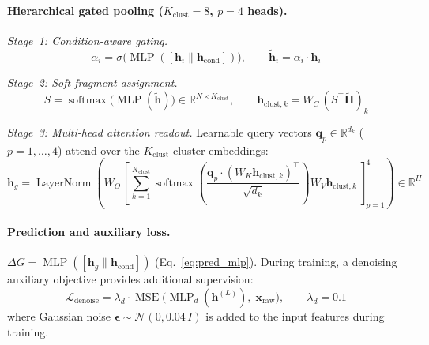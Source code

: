 \documentclass[11pt]{article}
\begin{document}
\paragraph{Hierarchical gated pooling ($K_{\mathrm{clust}} = 8$, $p = 4$ heads).}

\textit{Stage~1: Condition-aware gating.}
\begin{equation}
  \alpha_i = \sigma\!\bigl(
    \operatorname{MLP}([\mathbf{h}_i \| \mathbf{h}_{\mathrm{cond}}])
  \bigr), \qquad
  \tilde{\mathbf{h}}_i = \alpha_i \cdot \mathbf{h}_i
\end{equation}

\textit{Stage~2: Soft fragment assignment.}
\begin{equation}
  S = \operatorname{softmax}\!\bigl(
    \operatorname{MLP}(\tilde{\mathbf{h}})
  \bigr) \in \mathbb{R}^{N \times K_{\mathrm{clust}}}, \qquad
  \mathbf{h}_{\mathrm{clust},k} = W_C\,
  (S^\top \tilde{\mathbf{H}})_k
  \label{eq:soft_assign}
\end{equation}

\textit{Stage~3: Multi-head attention readout.}
Learnable query vectors $\mathbf{q}_p \in \mathbb{R}^{d_k}$ ($p = 1, \ldots, 4$)
attend over the $K_{\mathrm{clust}}$ cluster embeddings:
\begin{equation}
  \mathbf{h}_g = \operatorname{LayerNorm}\!\left(
    W_O \left[\,
    \sum_{k=1}^{K_{\mathrm{clust}}}
    \operatorname{softmax}\!\left(
      \frac{\mathbf{q}_p \cdot (W_K \mathbf{h}_{\mathrm{clust},k})^\top}
      {\sqrt{d_k}}
    \right)
    W_V \mathbf{h}_{\mathrm{clust},k}
    \,\right]_{p=1}^{4}
  \right) \in \mathbb{R}^{H}
\end{equation}

\paragraph{Prediction and auxiliary loss.}
$\Delta G = \operatorname{MLP}([\mathbf{h}_g \| \mathbf{h}_{\mathrm{cond}}])$
(Eq.~\ref{eq:pred_mlp}).
During training, a denoising auxiliary objective provides additional
supervision:
\begin{equation}
  \mathcal{L}_{\mathrm{denoise}} = \lambda_d \cdot
  \operatorname{MSE}\!\bigl(
    \operatorname{MLP}_d(\mathbf{h}^{(L)}),\;
    \mathbf{x}_{\mathrm{raw}}
  \bigr), \qquad
  \lambda_d = 0.1
  \label{eq:denoise}
\end{equation}
where Gaussian noise $\boldsymbol{\epsilon} \sim \mathcal{N}(0, 0.04\, I)$
is added to the input features during training.
\end{document}
